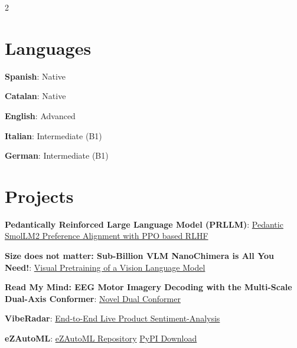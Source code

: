 \documentclass[letterpaper,8pt]{article} %
\begin{document}
\begin{multicols}{2}

\section{Languages}
 \begin{itemize}[leftmargin=0.15in, label={}]
    \footnotesize{
    \item{\textbf{Spanish}: Native}
    \item{\textbf{Catalan}: Native}
    \item{\textbf{English}: Advanced}
    \item{\textbf{Italian}: Intermediate (B1)}
    \item{\textbf{German}: Intermediate (B1)}
    }
 \end{itemize}

\columnbreak

\section{Projects}
 \begin{itemize}[leftmargin=0.15in, label={}]
    \footnotesize{
        \item{\textbf{Pedantically Reinforced Large Language Model (PRLLM)}}:             \href{https://github.com/eZWALT/RL-Reinforcement-Learning/tree/main/PROJECT}{Pedantic SmolLM2 Preference Alignment with PPO based RLHF}

        \item{\textbf{Size does not matter: Sub-Billion VLM NanoChimera is All You Need!}}:
        \href{https://github.com/eZWALT/CVCS-Computer-Vision-and-Cognitive-Systems/tree/main/PROJECT}{Visual Pretraining of a Vision Language Model}

        \item{\textbf{Read My Mind: EEG Motor Imagery Decoding with the Multi-Scale Dual-Axis Conformer}}: \href{https://github.com/eZWALT/RL-Reinforcement-Learning/tree/main/PROJECT}{Novel Dual Conformer}

        \item{\textbf{VibeRadar}}: \href{https://github.com/eZWALT/BDM-Big-Data-Management/tree/main/PROJECT}{End-to-End Live Product Sentiment-Analysis}


        
        \item{\textbf{eZAutoML}:
            \href{https://github.com/eZWALT/eZAutoML}{eZAutoML Repository}
            \href{https://pypi.org/project/eZAutoML/}{PyPI Download}
        }
        
}
\end{itemize}
\end{multicols}
\end{document}
